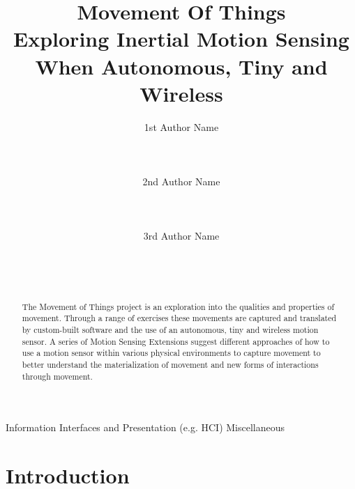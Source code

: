 \documentclass{sigchi}
\begin{document}
\title{Movement Of Things\\
Exploring Inertial Motion Sensing\\
When Autonomous, Tiny and Wireless}

\author{
  \alignauthor 1st Author Name\\
    \\
    \\
    \\
  \alignauthor 2nd Author Name\\
    \\
    \\
    \\
  \alignauthor 3rd Author Name\\
    \\
    \\
    \\
}

\maketitle

\begin{abstract}
The Movement of Things project is an exploration into
the qualities and properties of movement. Through a
range of exercises these movements are captured and
translated by custom-built software and the use of an
autonomous, tiny and wireless motion sensor. A series
of Motion Sensing Extensions suggest different
approaches of how to use a motion sensor within
various physical environments to capture movement to
better understand the materialization of movement and
new forms of interactions through movement.
\end{abstract}


{Information Interfaces and Presentation (e.g. HCI)}
{Miscellaneous}

\section{Introduction}
\end{document}
